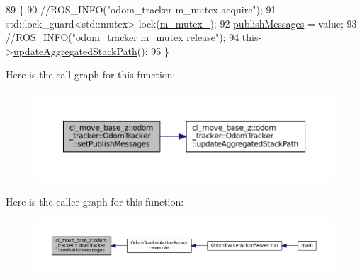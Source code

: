 \begin{DoxyCode}
89         \{
90             \textcolor{comment}{//ROS\_INFO("odom\_tracker m\_mutex acquire");}
91             std::lock\_guard<std::mutex> lock(\hyperlink{classcl__move__base__z_1_1odom__tracker_1_1OdomTracker_aa371639e1eee269273dec8d3ab9dba0f}{m\_mutex\_});
92             \hyperlink{classcl__move__base__z_1_1odom__tracker_1_1OdomTracker_a4f253d45ab5750dee3c2f18dd5599725}{publishMessages} = value;
93             \textcolor{comment}{//ROS\_INFO("odom\_tracker m\_mutex release");}
94             this->\hyperlink{classcl__move__base__z_1_1odom__tracker_1_1OdomTracker_a7922f1e1e688a2ed62d32d9914985a9f}{updateAggregatedStackPath}();
95         \}
\end{DoxyCode}
Here is the call graph for this function\+:
\nopagebreak
\begin{figure}[H]
\begin{center}
\leavevmode
\includegraphics[width=350pt]{classcl__move__base__z_1_1odom__tracker_1_1OdomTracker_a3b3cf9010e4e4fe4f96cfafd5a529517_cgraph}
\end{center}
\end{figure}
Here is the caller graph for this function\+:
\nopagebreak
\begin{figure}[H]
\begin{center}
\leavevmode
\includegraphics[width=350pt]{classcl__move__base__z_1_1odom__tracker_1_1OdomTracker_a3b3cf9010e4e4fe4f96cfafd5a529517_icgraph}
\end{center}
\end{figure}
\mbox{\label{classcl__move__base__z_1_1odom__tracker_1_1OdomTracker_a9f4989c6353022c2ec3b0546c09bf3bc}} 
